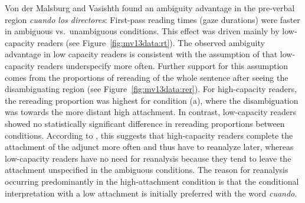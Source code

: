 \documentclass{cambridge7A}\usepackage[]{graphicx}\usepackage[]{color}
\begin{document}
Von der Malsburg and Vasishth found an ambiguity advantage in the pre-verbal region \textit{cuando los directores}: First-pass reading times (gaze durations) were faster in ambiguous vs.\ unambiguous conditions. This effect was driven mainly by low-capacity readers (see Figure~\ref{fig:mv13data:rt}). The observed ambiguity advantage in low capacity readers is consistent with the assumption of \cite{Traxler2007} that low-capacity readers underspecify more often. Further support for this assumption comes from the proportions of rereading of the whole sentence after seeing the disambiguating region (see Figure~\ref{fig:mv13data:rer}). 
For high-capacity readers, the rereading proportion was highest for condition (a), where the disambiguation was towards the more distant high attachment. In contrast, low-capacity readers showed no statistically significant difference in rereading proportions between conditions. According to \cite{MalsburgVasishth2013}, this suggests that high-capacity readers complete the attachment of the adjunct more often and thus have to reanalyze later, whereas low-capacity readers have no need for reanalysis because they tend to leave the attachment unspecified in the ambiguous conditions. The reason for reanalysis occurring predominantly in the high-attachment condition is that the conditional interpretation with a low attachment is initially preferred with the word \textit{cuando}.


\end{document}
